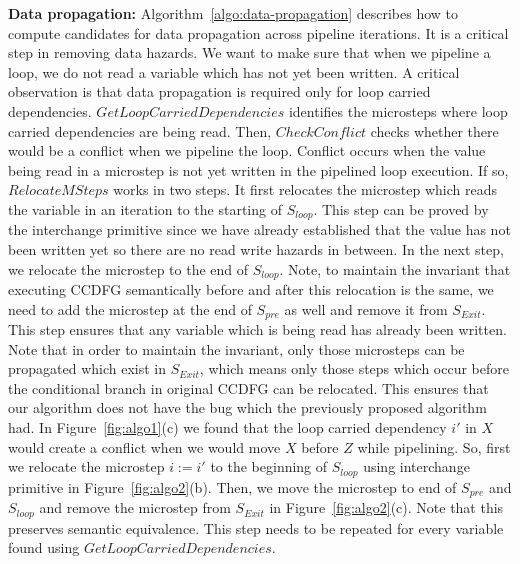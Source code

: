 {\bf Data propagation:} Algorithm~\ref{algo:data-propagation} describes how to compute candidates for data
propagation across pipeline iterations. It is a critical step in removing data hazards. We want to make sure that when we pipeline a loop, we do not read a variable which has not
yet been written. A critical observation is that data propagation is required only for loop carried dependencies.
$GetLoopCarriedDependencies$ identifies the microsteps where loop carried dependencies are being read. Then,
$CheckConflict$ checks whether there would be a conflict when we pipeline the loop.
Conflict occurs when the value being read in a microstep is not yet written in the pipelined loop execution. If so, $RelocateMSteps$ works in two steps. It first relocates the microstep which reads the variable in an iteration to the starting of $S_{loop}$. This step can be proved by the interchange primitive since we have already established that the value has not been written yet so there are no read write hazards in between. In the next step, we relocate the microstep to the end of $S_{loop}$. Note, to maintain the invariant that executing CCDFG semantically before and after this relocation is the same, we need to add the microstep at the end of $S_{pre}$ as well and remove it from $S_{Exit}$. This step ensures that any variable which is being read has already been written. Note that in order to maintain the invariant, only those microsteps can be propagated which exist in $S_{Exit}$, which means only those steps which occur before the conditional branch in original CCDFG can be relocated. This ensures that our algorithm does not have the bug which the previously proposed algorithm had.
In Figure~\ref{fig:algo1}(c) we found that the loop carried dependency $i'$ in $X$ would create a conflict when we would move $X$ before $Z$ while pipelining. So, first we relocate the microstep $i := i'$ to the beginning of $S_{loop}$ using interchange primitive in Figure~\ref{fig:algo2}(b). Then, we move the microstep to end of $S_{pre}$ and $S_{loop}$ and remove the microstep from $S_{Exit}$ in  Figure~\ref{fig:algo2}(c). Note that this preserves semantic equivalence.
This step needs to be repeated for every variable found using $GetLoopCarriedDependencies$.



